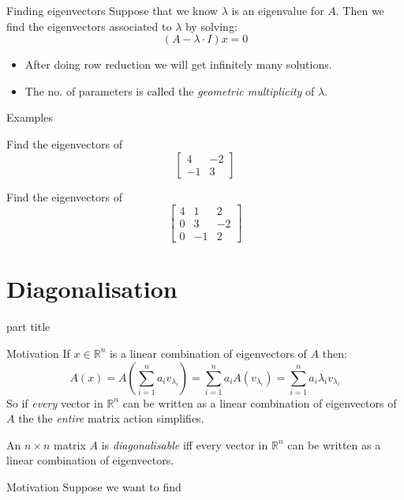 \documentclass{beamer}
\begin{document}
\begin{frame}{Finding eigenvectors}
Suppose that we know $\lambda$ is an eigenvalue for $A$.\vfill
Then we find the eigenvectors associated to $\lambda$ by solving:
\begin{equation*}
(A-\lambda\cdot I)x = 0
\end{equation*}\vfill
\begin{itemize}
	\item After doing row reduction we will get infinitely many solutions.
	\item The no. of parameters is called the \emph{geometric multiplicity} of $\lambda$.
\end{itemize}
\end{frame}

\begin{frame}{Examples}
\begin{example}
	Find the eigenvectors of
	\begin{equation*}
		\left[
		\begin{matrix}
		4&-2\\
		-1&3
		\end{matrix}
		\right]
	\end{equation*}
\end{example}
\begin{example}
	Find the eigenvectors of
	\begin{equation*}
		\left[
		\begin{matrix}
		4&1&2\\
		0&3&-2\\
		0&-1&2
		\end{matrix}
		\right]
	\end{equation*}
\end{example}
\end{frame}


\section{Diagonalisation}

\begin{frame}
\begin{beamercolorbox}[sep=12pt,center]{part title}
\insertsection\par
\end{beamercolorbox}
\end{frame}

\begin{frame}{Motivation}
If $x\in \mathbb{R}^n$ is a linear combination of eigenvectors of $A$ then:
\begin{equation*}
	A(x) = A\left(\sum_{i=1}^n a_i v_{\lambda_i}\right) = \sum_{i=1}^n a_iA(v_{\lambda_i}) = \sum_{i=1}^n a_i\lambda_iv_{\lambda_i}
\end{equation*}
So if \emph{every} vector in $\mathbb{R}^n$ can be written as a linear combination of eigenvectors of $A$ the the \emph{entire} matrix action simplifies.\vfill
\begin{definition}
	An $n\times n$ matrix $A$ is \emph{diagonalisable} iff every vector in $\mathbb{R}^n$ can be written as a linear combination of eigenvectors.
\end{definition}
\end{frame}

\begin{frame}{Motivation}
Suppose we want to find 
\end{frame}
\end{document}
